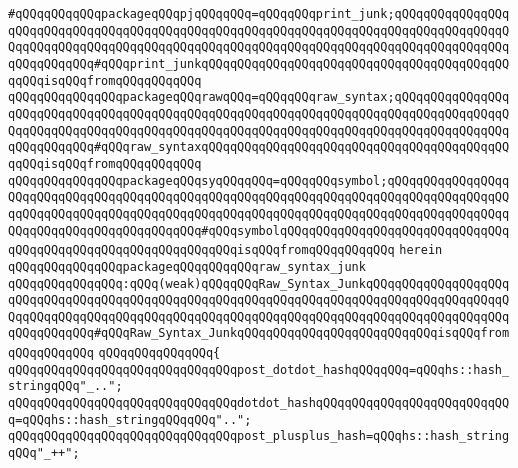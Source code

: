 \verb|#qQQqqQQqqQQqpackageqQQqpjqQQqqQQq=qQQqqQQqprint_junk;qQQqqQQqqQQqqQQqqQQqqQQqqQQqqQQqqQQqqQQqqQQqqQQqqQQqqQQqqQQqqQQqqQQqqQQqqQQqqQQqqQQqqQQqqQQqqQQqqQQqqQQqqQQqqQQqqQQqqQQqqQQqqQQqqQQqqQQqqQQqqQQqqQQqqQQqqQQqqQQqqQQqqQQq#qQQqprint_junkqQQqqQQqqQQqqQQqqQQqqQQqqQQqqQQqqQQqqQQqqQQqqQQqisqQQqfromqQQqqQQqqQQq|\newline
\verb|qQQqqQQqqQQqqQQqpackageqQQqrawqQQq=qQQqqQQqraw_syntax;qQQqqQQqqQQqqQQqqQQqqQQqqQQqqQQqqQQqqQQqqQQqqQQqqQQqqQQqqQQqqQQqqQQqqQQqqQQqqQQqqQQqqQQqqQQqqQQqqQQqqQQqqQQqqQQqqQQqqQQqqQQqqQQqqQQqqQQqqQQqqQQqqQQqqQQqqQQqqQQqqQQqqQQq#qQQqraw_syntaxqQQqqQQqqQQqqQQqqQQqqQQqqQQqqQQqqQQqqQQqqQQqqQQqisqQQqfromqQQqqQQqqQQq|\newline
\verb|qQQqqQQqqQQqqQQqpackageqQQqsyqQQqqQQq=qQQqqQQqsymbol;qQQqqQQqqQQqqQQqqQQqqQQqqQQqqQQqqQQqqQQqqQQqqQQqqQQqqQQqqQQqqQQqqQQqqQQqqQQqqQQqqQQqqQQqqQQqqQQqqQQqqQQqqQQqqQQqqQQqqQQqqQQqqQQqqQQqqQQqqQQqqQQqqQQqqQQqqQQqqQQqqQQqqQQqqQQqqQQqqQQqqQQq#qQQqsymbolqQQqqQQqqQQqqQQqqQQqqQQqqQQqqQQqqQQqqQQqqQQqqQQqqQQqqQQqqQQqqQQqisqQQqfromqQQqqQQqqQQq|\newline
\verb|herein|\newline
\newline
\verb|qQQqqQQqqQQqqQQqpackageqQQqqQQqqQQqraw_syntax_junk|\newline
\verb|qQQqqQQqqQQqqQQq:qQQq(weak)qQQqqQQqRaw_Syntax_JunkqQQqqQQqqQQqqQQqqQQqqQQqqQQqqQQqqQQqqQQqqQQqqQQqqQQqqQQqqQQqqQQqqQQqqQQqqQQqqQQqqQQqqQQqqQQqqQQqqQQqqQQqqQQqqQQqqQQqqQQqqQQqqQQqqQQqqQQqqQQqqQQqqQQqqQQqqQQqqQQqqQQqqQQqqQQq#qQQqRaw_Syntax_JunkqQQqqQQqqQQqqQQqqQQqqQQqqQQqisqQQqfromqQQqqQQqqQQq|\newline
\verb|qQQqqQQqqQQqqQQq{|\newline
\verb|qQQqqQQqqQQqqQQqqQQqqQQqqQQqqQQqpost_dotdot_hashqQQqqQQq=qQQqhs::hash_stringqQQq"_..";|\newline
\verb|qQQqqQQqqQQqqQQqqQQqqQQqqQQqqQQqdotdot_hashqQQqqQQqqQQqqQQqqQQqqQQqqQQq=qQQqhs::hash_stringqQQqqQQq"..";|\newline
\newline
\verb|qQQqqQQqqQQqqQQqqQQqqQQqqQQqqQQqpost_plusplus_hash=qQQqhs::hash_stringqQQq"_++";|\newline
